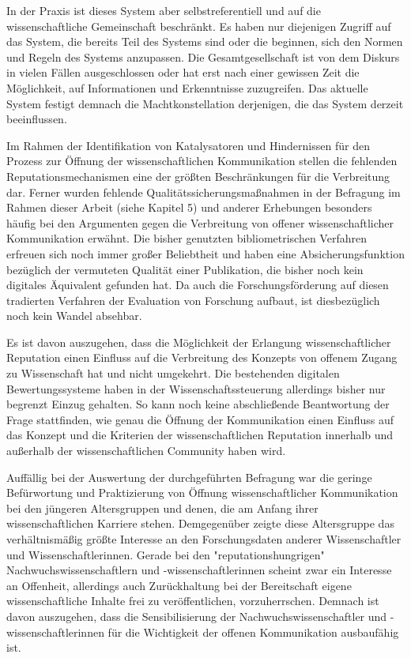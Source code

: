 In der Praxis ist dieses System aber selbstreferentiell und auf die wissenschaftliche Gemeinschaft beschränkt. Es haben nur diejenigen Zugriff auf das System, die bereits Teil des Systems sind oder die beginnen, sich den Normen und Regeln des Systems anzupassen. Die Gesamtgesellschaft ist von dem Diskurs in vielen Fällen ausgeschlossen oder hat erst nach einer gewissen Zeit die Möglichkeit, auf Informationen und Erkenntnisse zuzugreifen. Das aktuelle System festigt demnach die Machtkonstellation derjenigen, die das System derzeit beeinflussen.

Im Rahmen der Identifikation von Katalysatoren und Hindernissen für den Prozess zur Öffnung der wissenschaftlichen Kommunikation stellen die fehlenden Reputationsmechanismen eine der größten Beschränkungen für die Verbreitung dar. Ferner wurden fehlende Qualitätssicherungsmaßnahmen in der Befragung im Rahmen dieser Arbeit (siehe Kapitel 5) und anderer Erhebungen \cite{European_Commission_2015b} besonders häufig bei den Argumenten gegen die Verbreitung von offener wissenschaftlicher Kommunikation erwähnt. Die bisher genutzten bibliometrischen Verfahren erfreuen sich noch immer großer Beliebtheit und haben eine Absicherungsfunktion bezüglich der vermuteten Qualität einer Publikation, die bisher noch kein digitales Äquivalent gefunden hat. Da auch die Forschungsförderung auf diesen tradierten Verfahren der Evaluation von Forschung aufbaut, ist diesbezüglich noch kein Wandel absehbar.

Es ist davon auszugehen, dass die Möglichkeit der Erlangung wissenschaftlicher Reputation einen Einfluss auf die Verbreitung des Konzepts von offenem Zugang zu Wissenschaft hat und nicht umgekehrt. Die bestehenden digitalen Bewertungssysteme haben in der Wissenschaftssteuerung allerdings bisher nur begrenzt Einzug gehalten. So kann noch keine abschließende Beantwortung der Frage stattfinden, wie genau die Öffnung der Kommunikation einen Einfluss auf das Konzept und die Kriterien der wissenschaftlichen Reputation innerhalb und außerhalb der wissenschaftlichen Community haben wird.

Auffällig bei der Auswertung der durchgeführten Befragung war die geringe Befürwortung und Praktizierung von Öffnung wissenschaftlicher Kommunikation bei den jüngeren Altersgruppen und denen, die am Anfang ihrer wissenschaftlichen Karriere stehen. Demgegenüber zeigte diese Altersgruppe das verhältnismäßig größte Interesse an den Forschungsdaten anderer Wissenschaftler und Wissenschaftlerinnen. Gerade bei den "reputationshungrigen" Nachwuchswissenschaftlern und -wissenschaftlerinnen scheint zwar ein Interesse an Offenheit, allerdings auch Zurückhaltung bei der Bereitschaft eigene wissenschaftliche Inhalte frei zu veröffentlichen, vorzuherrschen. Demnach ist davon auszugehen, dass die Sensibilisierung der Nachwuchswissenschaftler und -wissenschaftlerinnen für die Wichtigkeit der offenen Kommunikation ausbaufähig ist.

